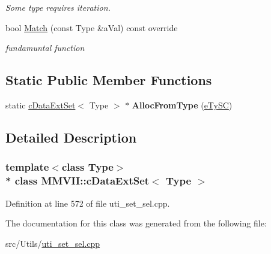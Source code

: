 \begin{DoxyCompactItemize}
\begin{DoxyCompactList}\small\item\em Some type requires iteration. \end{DoxyCompactList}\item 
bool \hyperlink{classMMVII_1_1cDataExtSet_a488952a851fb4aa64dff79ddde52dba6}{Match} (const Type \&a\+Val) const override\hypertarget{classMMVII_1_1cDataExtSet_a488952a851fb4aa64dff79ddde52dba6}{}\label{classMMVII_1_1cDataExtSet_a488952a851fb4aa64dff79ddde52dba6}

\begin{DoxyCompactList}\small\item\em fundamuntal function \end{DoxyCompactList}\end{DoxyCompactItemize}
\subsection*{Static Public Member Functions}
\begin{DoxyCompactItemize}
\item 
static \hyperlink{classMMVII_1_1cDataExtSet}{c\+Data\+Ext\+Set}$<$ Type $>$ $\ast$ {\bfseries Alloc\+From\+Type} (\hyperlink{MMVII__enums_8h_a04fcd74deb7c7ab4218cbb194a03239c}{e\+Ty\+SC})\hypertarget{classMMVII_1_1cDataExtSet_a41d4e611ae70f293f6556d297cb8872f}{}\label{classMMVII_1_1cDataExtSet_a41d4e611ae70f293f6556d297cb8872f}

\end{DoxyCompactItemize}


\subsection{Detailed Description}
\subsubsection*{template$<$class Type$>$\\*
class M\+M\+V\+I\+I\+::c\+Data\+Ext\+Set$<$ Type $>$}



Definition at line 572 of file uti\+\_\+set\+\_\+sel.\+cpp.



The documentation for this class was generated from the following file\+:\begin{DoxyCompactItemize}
\item 
src/\+Utils/\hyperlink{uti__set__sel_8cpp}{uti\+\_\+set\+\_\+sel.\+cpp}\end{DoxyCompactItemize}
